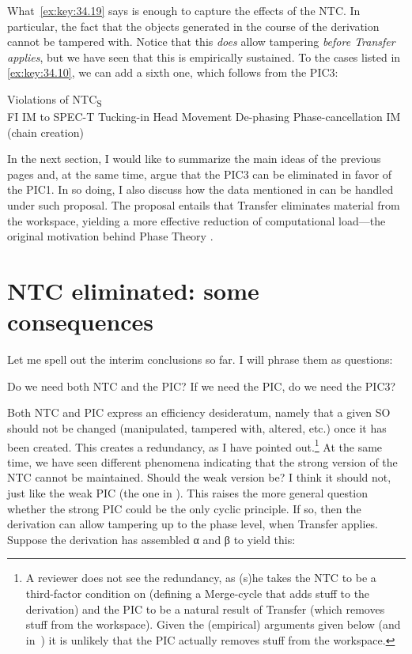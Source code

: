 \documentclass[output=paper]{langsci/langscibook}
\begin{document}
What~\eqref{ex:key:34.19} says is enough to capture the effects of the
\gls{NTC}. In particular, the fact that the objects generated in the course of
the derivation cannot be tampered with. Notice that this \emph{does} allow
tampering \emph{before Transfer applies}, but we have seen that this is
empirically sustained. To the cases listed in \eqref{ex:key:34.10}, we can add
a sixth one, which follows from the PIC3:

\ea%
    \label{ex:key:34.20}Violations of NTC\textsubscript{S}\\
    \ea \glsdesc{FI} \citep{Chomsky2008}
    \ex \gls{IM} to SPEC-T \citep{Chomsky2008}
	\ex Tucking-in \citep{Richards1997}
	\ex Head Movement \citep{Chomsky2001}
	\ex De-phasing \citep{Chomsky2015}
    \ex Phase-cancellation \parencite{EKS2016}
    \ex \gls{IM} (chain creation)
	\z
\z

In the next section, I would like to summarize the main ideas of the previous
pages and, at the same time, argue that the PIC3 can be eliminated in favor of
the PIC1. In so doing, I also discuss how the data mentioned in
\citet{Chomsky2016} can be handled under such proposal. The proposal entails
that Transfer eliminates material from the workspace, yielding a more effective
reduction of computational load—the original motivation behind Phase Theory
\parencite[cf.][]{Chomsky2000}.

\section{NTC eliminated: some consequences}\label{sec:34.4}

Let me spell out the interim conclusions so far. I will phrase them as
questions:

\ea%
    \label{ex:key:34.21}
    \ea Do we need both \gls{NTC} and the \gls{PIC}?
	\ex If we need the \gls{PIC}, do we need the PIC3?
	\z
\z

Both \gls{NTC} and \gls{PIC} express an efficiency desideratum, namely that a
given \gls{SO} should not be changed (manipulated, tampered with, altered, etc.) once
it has been created. This creates a redundancy, as I have pointed
out.\footnote{A reviewer does not see the redundancy, as (s)he takes the
    \gls{NTC} to be a third-factor condition on  (defining a Merge-cycle
    that adds stuff to the derivation) and the \gls{PIC} to be a natural result
    of Transfer (which removes stuff from the workspace). Given the (empirical)
arguments given below (and in~\citealt{ChoGalOtt2019}) it is unlikely that the
\gls{PIC} actually removes stuff from the workspace.} At the same time, we have
seen different phenomena indicating that the strong version of the \gls{NTC}
cannot be maintained. Should the weak version be? I think it should not, just
like the weak \gls{PIC} (the one in \citealt{Chomsky2001}). This raises the
more general question whether the strong \gls{PIC} could be the only cyclic
principle. If so, then the derivation can allow tampering up to the phase
level, when Transfer applies. Suppose the derivation has assembled α and β to
yield this:
\end{document}
